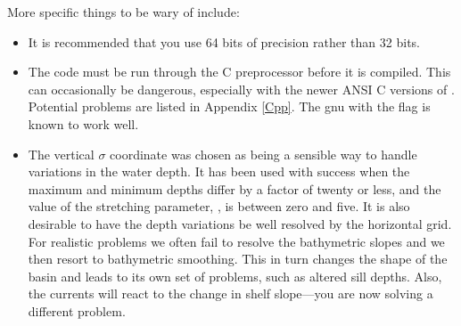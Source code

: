 More specific things to be wary of include:
\begin{itemize}
  \item It is recommended that you use 64 bits of precision rather
than 32 bits.
  \item The code must be run through the C preprocessor before it
is compiled.  This can occasionally be dangerous, especially with
the newer ANSI C versions of .  Potential problems are listed
in Appendix \ref{Cpp}. The gnu  with the  flag
is known to work well.
  \item The vertical $\sigma$ coordinate was chosen as being a sensible
way to handle variations in the water depth.  It has been used with
success when the maximum and minimum depths differ by a factor of
twenty or less, and the value of the stretching parameter,
, is between zero and five.  It is also desirable to
have the depth variations be well resolved by the
horizontal grid.  For realistic problems we often fail to resolve the
bathymetric slopes and we then resort to bathymetric smoothing.
This in turn changes the shape of the basin and leads to its own set of
problems, such as altered sill depths. Also, the currents will react to
the change in shelf slope---you are now solving a different problem.
\end{itemize}
